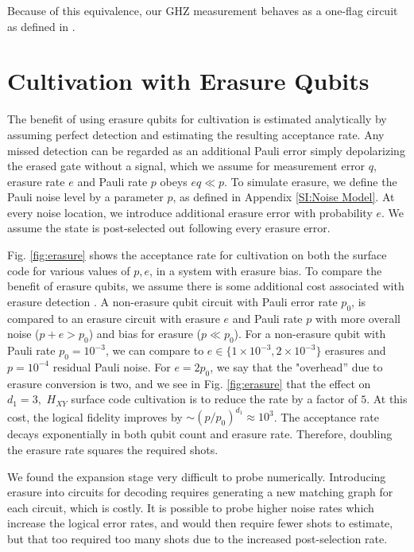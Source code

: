 \documentclass[twocolumn,notitlepage,nofootinbib,floatfix,superscriptaddress]{revtex4-1}
\begin{document}
 Because of this equivalence, our GHZ measurement behaves as a one-flag circuit as defined in \cite{chamberland2020very}.

\section{Cultivation with Erasure Qubits}
\label{SI:erasure}
The benefit of using erasure qubits for cultivation is estimated analytically by assuming perfect detection and estimating the resulting acceptance rate. Any missed detection can be regarded as an additional Pauli error simply depolarizing the erased gate without a signal, which we assume for measurement error $q$, erasure rate $e$ and Pauli rate $p$ obeys $eq \ll p$. To simulate erasure, we define the Pauli noise level by a parameter $p$, as defined in Appendix \ref{SI:Noise Model}. At every noise location, we introduce additional erasure error with probability $e$. We assume the state is post-selected out following every erasure error. 

Fig. \ref{fig:erasure} shows the acceptance rate for cultivation on both the surface code for various values of $p,e$, in a system with erasure bias. To compare the benefit of erasure qubits, we assume there is some additional cost associated with erasure detection \cite{gu2024optimizing}. A non-erasure qubit circuit with Pauli error rate $p_0$, is compared to an erasure circuit with erasure $e$ and Pauli rate $p$ with more overall noise ($p+e>p_0$) and  bias for erasure ($p\ll p_0$). For a non-erasure qubit with Pauli rate $p_0=10^{-3}$, we can compare to $e\in \{1\times 10^{-3}, 2\times 10^{-3}\}$ erasures and $p=10^{-4}$ residual Pauli noise. For $e=2 p_0$, we say that the "overhead'' due to erasure conversion is two, and we see in Fig. \ref{fig:erasure} that the effect on $d_1=3,$ $H_{XY}$ surface code cultivation is to reduce the rate by a factor of $5$. At this cost, the logical fidelity improves by $\sim(p/p_0)^{d_1}\approx 10^3$. The acceptance rate decays exponentially in both qubit count and erasure rate. Therefore, doubling the erasure rate squares the required shots. 

We found the expansion stage very difficult to probe numerically. Introducing erasure into circuits for decoding requires generating a new matching graph for each circuit, which is costly. It is possible to probe higher noise rates which increase the logical error rates, and would then require fewer shots to estimate, but that too required too many shots due to the increased post-selection rate. 
\end{document}
